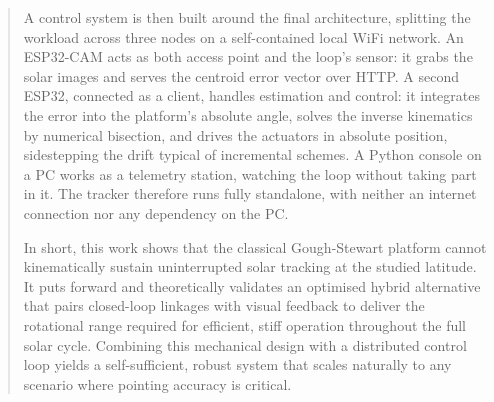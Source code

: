 \begin{abstract}
A control system is then built around the final architecture, splitting the workload across three nodes on a self-contained local WiFi network. An ESP32-CAM acts as both access point and the loop's sensor: it grabs the solar images and serves the centroid error vector over HTTP. A second ESP32, connected as a client, handles estimation and control: it integrates the error into the platform's absolute angle, solves the inverse kinematics by numerical bisection, and drives the actuators in absolute position, sidestepping the drift typical of incremental schemes. A Python console on a PC works as a telemetry station, watching the loop without taking part in it. The tracker therefore runs fully standalone, with neither an internet connection nor any dependency on the PC.

In short, this work shows that the classical Gough-Stewart platform cannot kinematically sustain uninterrupted solar tracking at the studied latitude. It puts forward and theoretically validates an optimised hybrid alternative that pairs closed-loop linkages with visual feedback to deliver the rotational range required for efficient, stiff operation throughout the full solar cycle. Combining this mechanical design with a distributed control loop yields a self-sufficient, robust system that scales naturally to any scenario where pointing accuracy is critical.
\end{abstract}

